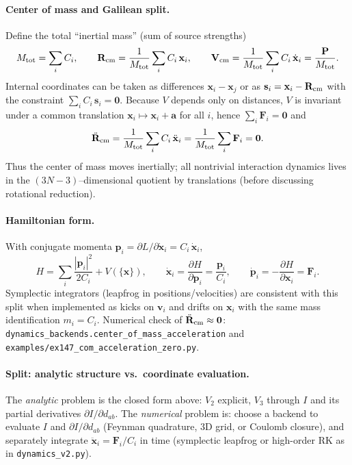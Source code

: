 \paragraph{Center of mass and Galilean split.}
Define the total ``inertial mass'' (sum of source strengths)
\begin{equation}
  M_{\rm tot}=\sum_i C_i,
  \qquad
  \mathbf{R}_{\rm cm}=\frac{1}{M_{\rm tot}}\sum_i C_i\,\mathbf{x}_i,
  \qquad
  \mathbf{V}_{\rm cm}=\frac{1}{M_{\rm tot}}\sum_i C_i\,\dot{\mathbf{x}}_i
  =\frac{\mathbf{P}}{M_{\rm tot}}.
\end{equation}
Internal coordinates can be taken as differences $\mathbf{x}_i-\mathbf{x}_j$ or
as $\mathbf{s}_i=\mathbf{x}_i-\mathbf{R}_{\rm cm}$ with the constraint
$\sum_i C_i\,\mathbf{s}_i=\mathbf{0}$.
Because $V$ depends only on distances, $V$ is invariant under a common translation
$\mathbf{x}_i\mapsto \mathbf{x}_i+\mathbf{a}$ for all $i$, hence
$\sum_i\mathbf{F}_i=\mathbf{0}$ and
\begin{equation}
  \ddot{\mathbf{R}}_{\rm cm}
  =\frac{1}{M_{\rm tot}}\sum_i C_i\,\ddot{\mathbf{x}}_i
  =\frac{1}{M_{\rm tot}}\sum_i\mathbf{F}_i=\mathbf{0}.
\end{equation}
Thus the center of mass moves inertially; all nontrivial interaction dynamics
lives in the $(3N-3)$--dimensional quotient by translations (before discussing
rotational reduction).

\paragraph{Hamiltonian form.}
With conjugate momenta $\mathbf{p}_i=\partial L/\partial\dot{\mathbf{x}}_i=C_i\,\dot{\mathbf{x}}_i$,
\begin{equation}
  H=\sum_i\frac{|\mathbf{p}_i|^2}{2C_i}+V(\{\mathbf{x}\}),
  \qquad
  \dot{\mathbf{x}}_i=\frac{\partial H}{\partial\mathbf{p}_i}=\frac{\mathbf{p}_i}{C_i},
  \qquad
  \dot{\mathbf{p}}_i=-\frac{\partial H}{\partial\mathbf{x}_i}=\mathbf{F}_i.
\end{equation}
Symplectic integrators (leapfrog in positions/velocities) are consistent with this
split when implemented as kicks on $\mathbf{v}_i$ and drifts on $\mathbf{x}_i$ with
the same mass identification $m_i=C_i$.
Numerical check of $\ddot{\mathbf{R}}_{\rm cm}\approx\mathbf{0}$:
\texttt{dynamics\_backends.center\_of\_mass\_acceleration} and
\texttt{examples/ex147\_com\_acceleration\_zero.py}.

\paragraph{Split: analytic structure vs.\ coordinate evaluation.}
The \emph{analytic} problem is the closed form above: $V_2$ explicit, $V_3$ through $I$ and its partial derivatives $\partial I/\partial d_{ab}$.
The \emph{numerical} problem is: choose a backend to evaluate $I$ and $\partial I/\partial d_{ab}$ (Feynman quadrature, 3D grid, or Coulomb closure), and separately integrate $\ddot{\mathbf{x}}_i=\mathbf{F}_i/C_i$ in time (symplectic leapfrog or high-order RK as in \texttt{dynamics\_v2.py}).


